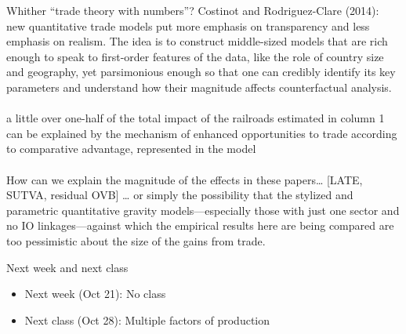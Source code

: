 \documentclass[10pt,notes=hide]{beamer}
\begin{document}
\begin{frame}{Whither ``trade theory with numbers''?}
Costinot and Rodriguez-Clare (2014): \\
{\footnotesize
new quantitative trade models put more emphasis on transparency and less emphasis on realism. The idea is to construct middle-sized models that are rich enough to speak to first-order features of the data, like the role of country size and geography, yet parsimonious enough so that one can credibly identify its key parameters and understand how their magnitude affects counterfactual analysis.} \\
 \\
{\footnotesize a little over one-half of the total impact of the railroads estimated in column 1 can be explained by the mechanism of enhanced opportunities to trade according to comparative advantage, represented in the model} \\
 \\
{\footnotesize How can we explain the magnitude of the effects in these papers\dots
[LATE, SUTVA, residual OVB]
\dots
or simply the possibility that the stylized and parametric quantitative gravity models—especially those with just one sector and no IO linkages—against which the empirical results here are being compared are too pessimistic about the size of the gains from trade.
}
\end{frame}
\begin{frame}{Next week and next class}
\begin{itemize}
	\item Next week (Oct 21): No class
	\item Next class (Oct 28): Multiple factors of production
\end{itemize}
\end{frame}
\end{document}
